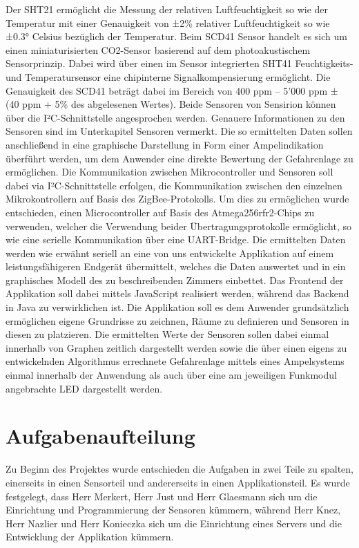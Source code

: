 \documentclass[]{article}
\begin{document}
	Der SHT21 ermöglicht die Messung der relativen Luftfeuchtigkeit so wie der Temperatur mit einer Genauigkeit von ±2\% relativer Luftfeuchtigkeit so wie ±0.3° Celsius bezüglich der Temperatur.\newline
	Beim SCD41 Sensor handelt es sich um einen miniaturisierten CO2-Sensor basierend auf dem photoakustischem Sensorprinzip. Dabei wird über einen im Sensor integrierten SHT41 Feuchtigkeits- und Temperatursensor eine chipinterne Signalkompensierung ermöglicht. Die Genauigkeit des SCD41 beträgt dabei im Bereich von 400 ppm – 5’000 ppm ± (40 ppm + 5\% des abgelesenen Wertes). Beide Sensoren von Sensirion können über die I²C-Schnittstelle angesprochen werden. Genauere Informationen zu den Sensoren sind im Unterkapitel Sensoren vermerkt.\newline
	Die so ermittelten Daten sollen anschließend in eine graphische Darstellung in Form einer Ampelindikation überführt werden, um dem Anwender eine direkte Bewertung der Gefahrenlage zu ermöglichen. Die Kommunikation zwischen Mikrocontroller und Sensoren soll dabei via I²C-Schnittstelle erfolgen, die Kommunikation zwischen den einzelnen Mikrokontrollern auf Basis des ZigBee-Protokolls. Um dies zu ermöglichen wurde entschieden, einen Microcontroller auf Basis des Atmega256rfr2-Chips zu verwenden, welcher die Verwendung beider Übertragungsprotokolle ermöglicht, so wie eine serielle Kommunikation über eine UART-Bridge. Die ermittelten Daten werden wie erwähnt seriell an eine von uns entwickelte Applikation auf einem leistungsfähigeren Endgerät übermittelt, welches die Daten auswertet und in ein graphisches Modell des zu beschreibenden Zimmers einbettet. Das Frontend der Applikation soll dabei mittels JavaScript realisiert werden, während das Backend in Java zu verwirklichen ist. Die Applikation soll es dem Anwender grundsätzlich ermöglichen eigene Grundrisse zu zeichnen, Räume zu definieren und Sensoren in diesen zu platzieren. Die ermittelten Werte der Sensoren sollen dabei einmal innerhalb von Graphen zeitlich dargestellt werden sowie die über einen eigens zu entwickelnden Algorithmus errechnete Gefahrenlage mittels eines Ampelsystems einmal innerhalb der Anwendung als auch über eine am jeweiligen Funkmodul angebrachte LED dargestellt werden. 
	
	\section{Aufgabenaufteilung} %
	Zu Beginn des Projektes wurde entschieden die Aufgaben in zwei Teile zu spalten, einerseits in einen Sensorteil und andererseits in einen Applikationsteil. Es wurde festgelegt, dass Herr Merkert, Herr Just und Herr Glaesmann sich um die Einrichtung und Programmierung der Sensoren kümmern, während Herr Knez, Herr Nazlier und Herr Konieczka sich um die Einrichtung eines Servers und die Entwicklung der Applikation kümmern. 
\end{document}

